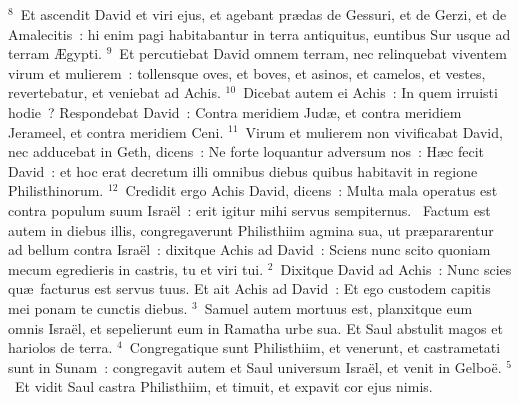 ${}^{8}$~Et ascendit David et viri ejus, et agebant pr\ae das de Gessuri, et de Gerzi, et de Amalecitis~: hi enim pagi habitabantur in terra antiquitus, euntibus Sur usque ad terram \AE gypti.
${}^{9}$~Et percutiebat David omnem terram, nec relinquebat viventem virum et mulierem~: tollensque oves, et boves, et asinos, et camelos, et vestes, revertebatur, et veniebat ad Achis.
${}^{10}$~Dicebat autem ei Achis~: In quem irruisti hodie~? Respondebat David~: Contra meridiem Jud\ae , et contra meridiem Jerameel, et contra meridiem Ceni.
${}^{11}$~Virum et mulierem non vivificabat David, nec adducebat in Geth, dicens~: Ne forte loquantur adversum nos~: H\ae c fecit David~: et hoc erat decretum illi omnibus diebus quibus habitavit in regione Philisthinorum.
${}^{12}$~Credidit ergo Achis David, dicens~: Multa mala operatus est contra populum suum Isra\"el~: erit igitur mihi servus sempiternus.
~\lettrine[lines=10,image=true,loversize=0.05,lraise=-0.03]{F}{}actum est autem in diebus illis, congregaverunt Philisthiim agmina sua, ut pr\ae pararentur ad bellum contra Isra\"el~: dixitque Achis ad David~: Sciens nunc scito quoniam mecum egredieris in castris, tu et viri tui.
${}^{2}$~Dixitque David ad Achis~: Nunc scies qu\ae\ facturus est servus tuus. Et ait Achis ad David~: Et ego custodem capitis mei ponam te cunctis diebus.
${}^{3}$~Samuel autem mortuus est, planxitque eum omnis Isra\"el, et sepelierunt eum in Ramatha urbe sua. Et Saul abstulit magos et hariolos de terra.
${}^{4}$~Congregatique sunt Philisthiim, et venerunt, et castrametati sunt in Sunam~: congregavit autem et Saul universum Isra\"el, et venit in Gelbo\"e.
${}^{5}$~Et vidit Saul castra Philisthiim, et timuit, et expavit cor ejus nimis.


